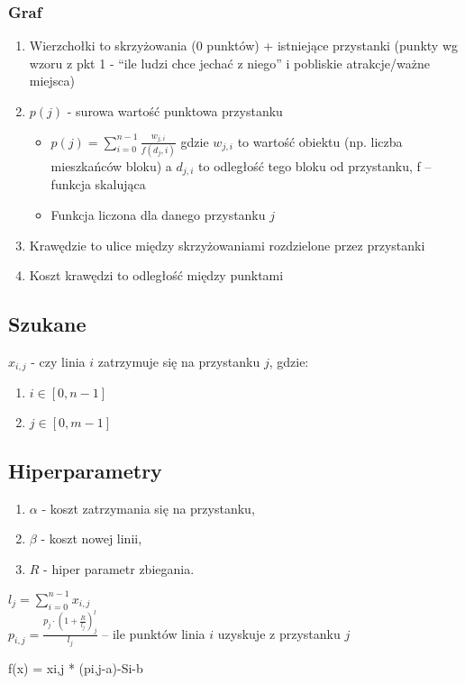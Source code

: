 \documentclass[12pt,a4paper,openright]{mwrep}
\begin{document}
\subsubsection{Graf}

	\begin{enumerate}
		\item Wierzchołki to skrzyżowania (0 punktów) + istniejące przystanki (punkty wg wzoru z pkt 1 - “ile ludzi chce jechać z niego” i pobliskie atrakcje/ważne miejsca)
		\item $p(j)$ - surowa wartość punktowa przystanku
		\begin{itemize}
			\item $p(j) = \sum_{i=0}^{n-1} \frac{w_{j, i}}{f(d_j, i)}$ gdzie $w_{j, i}$ to wartość obiektu (np. liczba mieszkańców bloku) a $d_{j,i}$ to odległość tego bloku od przystanku, f – funkcja skalująca
			\item Funkcja liczona dla danego przystanku $j$
		\end{itemize}
		\item Krawędzie to ulice między skrzyżowaniami rozdzielone przez przystanki
		\item Koszt krawędzi to odległość między punktami
	\end{enumerate}










\subsection{Szukane}
	$x_{i,j}$ - czy linia $i$ zatrzymuje się na przystanku $j$, gdzie:
	\begin{enumerate}
		\item $i \in \left[ 0, n-1 \right]$
		\item $j \in \left[ 0, m-1 \right]$
	\end{enumerate}

\subsection{Hiperparametry}
	\begin{enumerate}
		\item $\alpha$ - koszt zatrzymania się na przystanku,
		\item $\beta$ - koszt nowej linii,
		\item $R$ - hiper parametr zbiegania.
	\end{enumerate}



$l_j = \sum_{i=0}^{n-1} x_{i, j}$\\
$p_{i, j} = \frac{p_j \cdot (1+\frac{R}{l_j})^l_j}{l_j}$ -- ile punktów linia $i$ uzyskuje z przystanku $j$

f(x) =   xi,j * (pi,j-a)-Si-b
\end{document}
